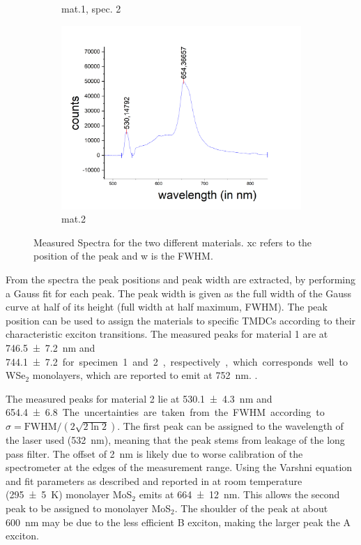 \begin{figure}[H]
\begin{subfigure}{0.47\textwidth}
        \caption{mat.1, spec. 2}
	      \label{fig_mono_spec2_1dspec}
    \end{subfigure}
    \begin{subfigure}{0.6\textwidth}
        \centering
        \includegraphics[width=\textwidth]{img/output_t1/spekt_m2}
        \caption{mat.2}
	      \label{fig_mono_spec3_1dspec}
    \end{subfigure}
    \caption{Measured Spectra for the two different materials. xc refers to the position of the peak and w is the FWHM.}
	\label{fig_mono_1dspectra} %
\end{figure}

From the spectra the peak positions and peak width are extracted, by performing a Gauss fit for each peak.
The peak width is given as the full width of the Gauss curve at half of its height (full width at half maximum, FWHM).
The peak position can be used to assign the materials to specific TMDCs according to their characteristic exciton transitions.
The measured peaks for material 1 are at \SI{746,5\pm 7,2}{nm} and \SI{744,1 \pm 7,2} for specimen 1 and 2, respectively, which corresponds well to WSe$_2$ monolayers, which are reported to emit at \SI{752}{nm}. \cite{Tonndorf2013}.

The measured peaks for material 2 lie at \SI{530,1 \pm 4,3}{nm} and \SI{654,4 \pm 6,8}.
The uncertainties are taken from the FWHM according to $\sigma = \mathrm{FWHM}/(2\sqrt{2 \ln 2})$.
The first peak can be assigned to the wavelength of the laser used (\SI{532}{nm}), meaning that the peak stems from leakage of the long pass filter.
The offset of \SI{2}{nm} is likely due to worse calibration of the spectrometer at the edges of the measurement range.
Using the Varshni equation and fit parameters as described and reported in \cite{xu19} at room temperature (\SI{295 \pm 5}{K}) monolayer MoS$_2$ emits at \SI{664 \pm 12}{nm}.
This allows the second peak to be assigned to monolayer MoS$_2$.
The shoulder of the peak at about \SI{600}{nm} may be due to the less efficient B exciton, making the larger peak the A exciton.
